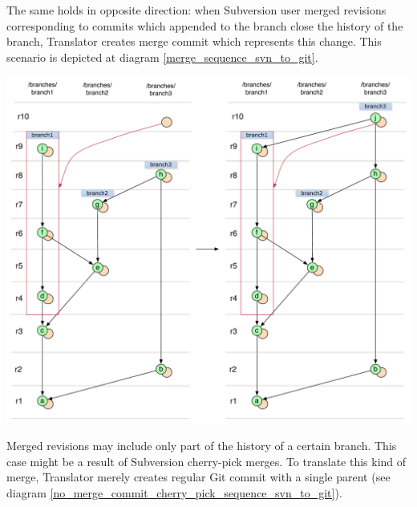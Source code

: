 The same holds in opposite direction: when Subversion user merged revisions corresponding to commits which appended to the branch close the history of the branch, Translator creates merge commit which represents this change. This scenario is depicted at diagram \ref{merge_sequence_svn_to_git}.

\begin{center}
\includegraphics[width=\textwidth]{img/diagrams/merge_sequence_svn_to_git.pdf}%
\label{merge_sequence_svn_to_git}%
\end{center}

Merged revisions may include only part of the history of a certain branch. 
This case might be a result of Subversion cherry-pick merges.
To translate this kind of merge, Translator merely creates regular Git commit with a single parent (see diagram \ref{no_merge_commit_cherry_pick_sequence_svn_to_git}). 

